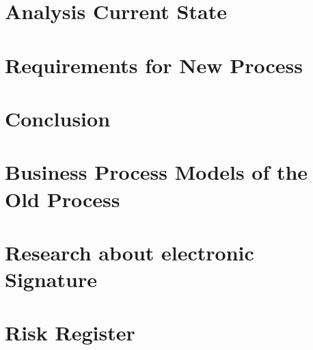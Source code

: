	\chapter{Analysis Current State}
	
	
	\chapter{Requirements for New Process}
	
	
	\chapter{Conclusion}
	
	
	\printbibliography
	
	\clearpage
	\appendix
	\chapter{Business Process Models of the Old Process}
	\label{bpmnOld}
	
	
	\chapter{Research about electronic Signature}
	
	
	\chapter{Risk Register}
	
	
	
	
